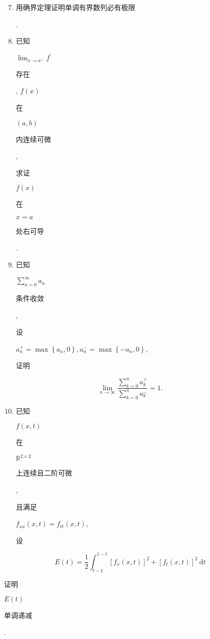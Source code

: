 \documentclass[10pt]{article}
\begin{document}
\begin{enumerate}
  \setcounter{enumi}{6}
  \item \begin{CJK}{UTF8}{mj}用确界定理证明单调有界数列必有极限\end{CJK}.

  \item \begin{CJK}{UTF8}{mj}已知\end{CJK} $\lim _{x \rightarrow a^{+}} f^{\prime}$ \begin{CJK}{UTF8}{mj}存在\end{CJK}, $f(x)$ \begin{CJK}{UTF8}{mj}在\end{CJK} $(a, b)$ \begin{CJK}{UTF8}{mj}内连续可微\end{CJK}, \begin{CJK}{UTF8}{mj}求证\end{CJK} $f(x)$ \begin{CJK}{UTF8}{mj}在\end{CJK} $x=a$ \begin{CJK}{UTF8}{mj}处右可导\end{CJK}.

  \item \begin{CJK}{UTF8}{mj}已知\end{CJK} $\sum_{n=0}^{\infty} a_{n}$ \begin{CJK}{UTF8}{mj}条件收敛\end{CJK}, \begin{CJK}{UTF8}{mj}设\end{CJK} $a_{n}^{+}=\max \left\{a_{n}, 0\right\}, a_{n}^{-}=\max \left\{-a_{n}, 0\right\}$, \begin{CJK}{UTF8}{mj}证明\end{CJK}

\end{enumerate}
$$
\lim _{n \rightarrow \infty} \frac{\sum_{k=0}^{n} a_{k}^{+}}{\sum_{k=0}^{n} a_{k}^{-}}=1 .
$$

\begin{enumerate}
  \setcounter{enumi}{9}
  \item \begin{CJK}{UTF8}{mj}已知\end{CJK} $f(x, t)$ \begin{CJK}{UTF8}{mj}在\end{CJK} $\mathbb{R}^{2 \times 2}$ \begin{CJK}{UTF8}{mj}上连续且二阶可微\end{CJK}, \begin{CJK}{UTF8}{mj}且满足\end{CJK} $f_{x x}(x, t)=f_{t t}(x, t)$, \begin{CJK}{UTF8}{mj}设\end{CJK}
\end{enumerate}
$$
E(t)=\frac{1}{2} \int_{t-1}^{1-t}\left[f_{x}(x, t)\right]^{2}+\left[f_{t}(x, t)\right]^{2} \mathrm{~d} t
$$
\begin{CJK}{UTF8}{mj}证明\end{CJK} $E(t)$ \begin{CJK}{UTF8}{mj}单调递减\end{CJK}.
\end{document}

